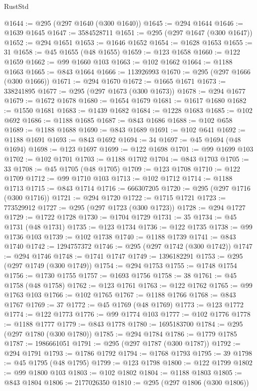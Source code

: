 \begin{lexlean}{RustStd}
\begin{coremodule}
@1644 := @295 (@297 @1640 (@300 @1640))
@1645 := @294 @1644
@1646 := @1639 @1645
@1647 := 3584528711
@1651 := @295 (@297 @1647 (@300 @1647))
@1652 := @294 @1651
@1653 := @1646 @1652
@1654 := @1628 @1653
@1655 := 31
@1658 := @45 @1655 (@48 @1655)
@1659 := @123 @1658
@1660 := @122 @1659
@1662 := @99 @1660 @103
@1663 := @102 @1662
@1664 := @1188 @1663
@1665 := @843 @1664
@1666 := 113926993
@1670 := @295 (@297 @1666 (@300 @1666))
@1671 := @294 @1670
@1672 := @1665 @1671
@1673 := 338241895
@1677 := @295 (@297 @1673 (@300 @1673))
@1678 := @294 @1677
@1679 := @1672 @1678
@1680 := @1654 @1679
@1681 := @1617 @1680
@1682 := @1550 @1681
@1683 := @1439 @1682
@1684 := @1228 @1683
@1685 := @102 @692
@1686 := @1188 @1685
@1687 := @843 @1686
@1688 := @102 @658
@1689 := @1188 @1688
@1690 := @843 @1689
@1691 := @102 @641
@1692 := @1188 @1691
@1693 := @843 @1692
@1694 := 34
@1697 := @45 @1694 (@48 @1694)
@1698 := @123 @1697
@1699 := @122 @1698
@1701 := @99 @1699 @103
@1702 := @102 @1701
@1703 := @1188 @1702
@1704 := @843 @1703
@1705 := 33
@1708 := @45 @1705 (@48 @1705)
@1709 := @123 @1708
@1710 := @122 @1709
@1712 := @99 @1710 @103
@1713 := @102 @1712
@1714 := @1188 @1713
@1715 := @843 @1714
@1716 := 666307205
@1720 := @295 (@297 @1716 (@300 @1716))
@1721 := @294 @1720
@1722 := @1715 @1721
@1723 := 773529912
@1727 := @295 (@297 @1723 (@300 @1723))
@1728 := @294 @1727
@1729 := @1722 @1728
@1730 := @1704 @1729
@1731 := 35
@1734 := @45 @1731 (@48 @1731)
@1735 := @123 @1734
@1736 := @122 @1735
@1738 := @99 @1736 @103
@1739 := @102 @1738
@1740 := @1188 @1739
@1741 := @843 @1740
@1742 := 1294757372
@1746 := @295 (@297 @1742 (@300 @1742))
@1747 := @294 @1746
@1748 := @1741 @1747
@1749 := 1396182291
@1753 := @295 (@297 @1749 (@300 @1749))
@1754 := @294 @1753
@1755 := @1748 @1754
@1756 := @1730 @1755
@1757 := @1693 @1756
@1758 := 38
@1761 := @45 @1758 (@48 @1758)
@1762 := @123 @1761
@1763 := @122 @1762
@1765 := @99 @1763 @103
@1766 := @102 @1765
@1767 := @1188 @1766
@1768 := @843 @1767
@1769 := 37
@1772 := @45 @1769 (@48 @1769)
@1773 := @123 @1772
@1774 := @122 @1773
@1776 := @99 @1774 @103
@1777 := @102 @1776
@1778 := @1188 @1777
@1779 := @843 @1778
@1780 := 1695183700
@1784 := @295 (@297 @1780 (@300 @1780))
@1785 := @294 @1784
@1786 := @1779 @1785
@1787 := 1986661051
@1791 := @295 (@297 @1787 (@300 @1787))
@1792 := @294 @1791
@1793 := @1786 @1792
@1794 := @1768 @1793
@1795 := 39
@1798 := @45 @1795 (@48 @1795)
@1799 := @123 @1798
@1800 := @122 @1799
@1802 := @99 @1800 @103
@1803 := @102 @1802
@1804 := @1188 @1803
@1805 := @843 @1804
@1806 := 2177026350
@1810 := @295 (@297 @1806 (@300 @1806))

\end{coremodule}
\end{lexlean}

